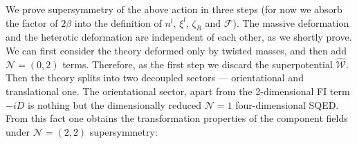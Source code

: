 \documentclass[12pt]{article}
\newcommand{\ntwot}{${\mathcal N}= \left(2,2\right) $ }
\newcommand{\ntwoo}{${\mathcal N}= \left(0,2\right) $ }
\newcommand{\none}{${\mathcal N}=1$ }
\newcommand{\mc}[1]{\mathcal{#1}}
\begin{document}
        We prove supersymmetry of the above action in three steps
	(for now we absorb the factor of $ 2\beta $ into the definition of $ n^l $, $ \xi^l $,
        $ \zeta_R $ and $ \mc{F} $).
        The massive deformation and the heterotic deformation are independent of each other, as we shortly prove.
	We can first consider the theory deformed only by twisted masses, and then add \ntwoo terms.
        Therefore, as the first step we discard the superpotential $ \hat{\mc{W}} $.
        Then the theory splits into two decoupled sectors --- orientational and translational one. 
        The orientational sector, apart from the 2-dimensional FI term $ - i D $ is nothing but
        the dimensionally reduced \none four-dimensional SQED.
        From this fact one obtains the transformation properties of the component fields under 
        \ntwot supersymmetry:
\end{document}
